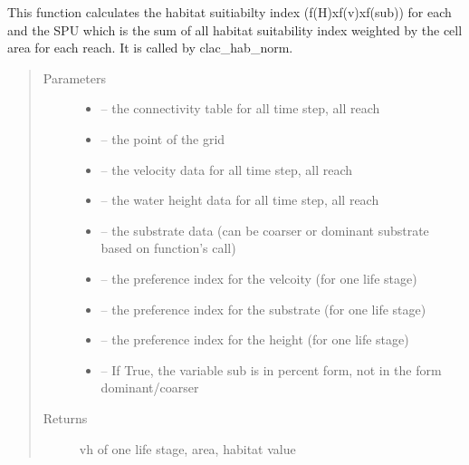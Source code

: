\documentclass[letterpaper,10pt,english]{sphinxmanual}
\begin{document}
\begin{fulllineitems}
\label{\detokenize{index:src.calcul_hab.calc_hab_norm}}
This function calculates the habitat suitiabilty index (f(H)xf(v)xf(sub)) for each and the SPU which is the sum of
all habitat suitability index weighted by the cell area for each reach. It is called by clac\_hab\_norm.
\begin{quote}\begin{description}
\item[{Parameters}] \leavevmode\begin{itemize}
\item {} 
 -- the connectivity table for all time step, all reach

\item {} 
 -- the point of the grid

\item {} 
 -- the velocity data for all time step, all reach

\item {} 
 -- the water height data for all time step, all reach

\item {} 
 -- the substrate data (can be coarser or dominant substrate based on function's call)

\item {} 
 -- the preference index for the velcoity (for one life stage)

\item {} 
 -- the preference index for the substrate  (for one life stage)

\item {} 
 -- the preference index for the height  (for one life stage)

\item {} 
 -- If True, the variable sub is in percent form, not in the form dominant/coarser

\end{itemize}

\item[{Returns}] \leavevmode
vh of one life stage, area, habitat value

\end{description}\end{quote}

\end{fulllineitems}
\end{document}
